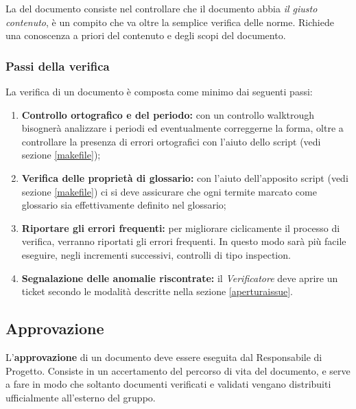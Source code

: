 La \textbf{} del documento consiste nel controllare che il documento abbia \textit{il giusto contenuto}, è un compito che va oltre la semplice verifica delle norme. Richiede una conoscenza a priori del contenuto e degli scopi del documento.
	
	
	\subsubsection{Passi della verifica}
	La verifica di un documento è composta come minimo dai seguenti passi:
	\begin{enumerate}
		\item \textbf{Controllo ortografico e del periodo:} con un controllo walktrough bisognerà analizzare i periodi ed eventualmente correggerne la forma, oltre a controllare la presenza di errori ortografici con l'aiuto dello script  (vedi sezione \ref{makefile});
		\item \textbf{Verifica delle proprietà di glossario:} con l'aiuto dell'apposito script  (vedi sezione \ref{makefile}) ci si deve assicurare che ogni termite marcato come glossario sia effettivamente definito nel glossario; 
		\item \textbf{Riportare gli errori frequenti:} per migliorare ciclicamente il processo di verifica, verranno riportati gli errori frequenti. In questo modo sarà più facile eseguire, negli incrementi successivi, controlli di tipo inspection.
		\item \textbf{Segnalazione delle anomalie riscontrate:} il \emph{Verificatore} deve aprire un ticket secondo le modalità descritte nella sezione \ref{aperturaissue}.
	\end{enumerate}

\subsection{Approvazione}

L'\textbf{approvazione} di un documento deve essere eseguita dal Responsabile di Progetto. Consiste in un accertamento del percorso di vita del documento, e serve a fare in modo che soltanto documenti verificati e validati vengano distribuiti ufficialmente all'esterno del gruppo.

